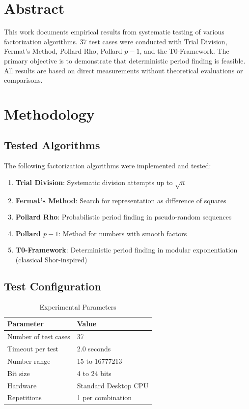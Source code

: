 \section*{Abstract}
		This work documents empirical results from systematic testing of various factorization algorithms. 37 test cases were conducted with Trial Division, Fermat's Method, Pollard Rho, Pollard $p-1$, and the T0-Framework. The primary objective is to demonstrate that deterministic period finding is feasible. All results are based on direct measurements without theoretical evaluations or comparisons.

	
	
	\section{Methodology}
	
	\subsection{Tested Algorithms}
	
	The following factorization algorithms were implemented and tested:
	
	\begin{enumerate}
		\item \textbf{Trial Division}: Systematic division attempts up to $\sqrt{n}$
		\item \textbf{Fermat's Method}: Search for representation as difference of squares
		\item \textbf{Pollard Rho}: Probabilistic period finding in pseudo-random sequences
		\item \textbf{Pollard $p-1$}: Method for numbers with smooth factors
		\item \textbf{T0-Framework}: Deterministic period finding in modular exponentiation (classical Shor-inspired)
	\end{enumerate}
	
	\subsection{Test Configuration}
	
	\begin{table}[H]
		\centering
		\caption{Experimental Parameters}
		\begin{tabular}{ll}
			\toprule
			\textbf{Parameter} & \textbf{Value} \\
			\midrule
			Number of test cases & 37 \\
			Timeout per test & 2.0 seconds \\
			Number range & 15 to 16777213 \\
			Bit size & 4 to 24 bits \\
			Hardware & Standard Desktop CPU \\
			Repetitions & 1 per combination \\
			\bottomrule
		\end{tabular}
		\label{tab:test_config}
	\end{table}
	
